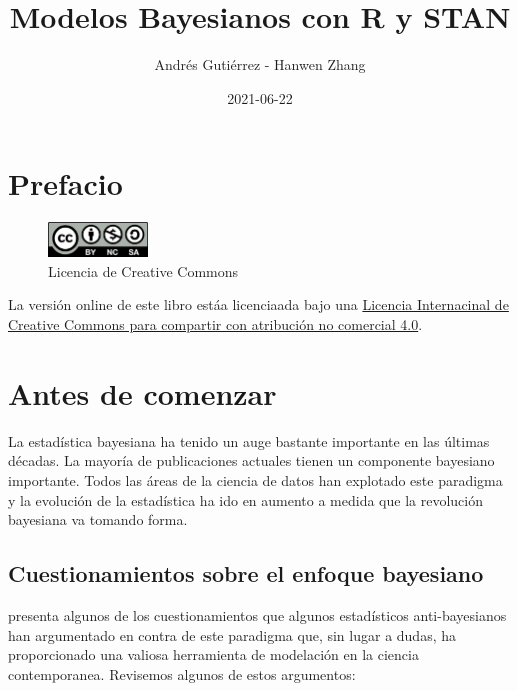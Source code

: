 \documentclass[
  10pt,
  spanish,
]{book}
\title{Modelos Bayesianos con R y STAN}
\author{Andrés Gutiérrez - Hanwen Zhang}
\date{2021-06-22}
\theoremstyle{definition}
\theoremstyle{definition}
\theoremstyle{definition}
\theoremstyle{definition}
\theoremstyle{remark}
\begin{document}
\maketitle

{
\hypersetup{linkcolor=}
\setcounter{tocdepth}{1}
\tableofcontents
}
\listoftables
\listoffigures
\hypertarget{prefacio}{%
\chapter*{Prefacio}\label{prefacio}}

\begin{figure}
\includegraphics[width=100px]{Pics/CClicence} \caption{Licencia de Creative Commons}\label{fig:unnamed-chunk-1}
\end{figure}

La versión online de este libro estáa licenciaada bajo una \href{http://creativecommons.org/licenses/by-nc-sa/4.0/}{Licencia Internacinal de Creative Commons para compartir con atribución no comercial 4.0}.

\hypertarget{antes-de-comenzar}{%
\chapter*{Antes de comenzar}\label{antes-de-comenzar}}

La estadística bayesiana ha tenido un auge bastante importante en las últimas décadas. La mayoría de publicaciones actuales tienen un componente bayesiano importante. Todos las áreas de la ciencia de datos han explotado este paradigma y la evolución de la estadística ha ido en aumento a medida que la revolución bayesiana va tomando forma.

\hypertarget{cuestionamientos-sobre-el-enfoque-bayesiano}{%
\section*{Cuestionamientos sobre el enfoque bayesiano}\label{cuestionamientos-sobre-el-enfoque-bayesiano}}

\citet{GelmanObjections} presenta algunos de los cuestionamientos que algunos estadísticos anti-bayesianos han argumentado en contra de este paradigma que, sin lugar a dudas, ha proporcionado una valiosa herramienta de modelación en la ciencia contemporanea. Revisemos algunos de estos argumentos:
\end{document}
